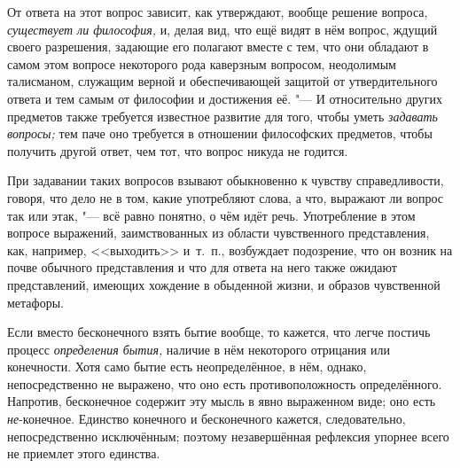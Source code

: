 От ответа на этот вопрос зависит, как утверждают, вообще решение вопроса,
{\em существует ли философия,} и, делая вид, что ещё
видят в нём вопрос, ждущий своего разрешения, задающие его полагают вместе
с тем, что они обладают в самом этом вопросе некоторого рода каверзным
вопросом, неодолимым талисманом, служащим верной и обеспечивающей защитой
от утвердительного ответа и тем самым от философии и достижения её. "--- И
относительно других предметов также требуется известное развитие для того,
чтобы уметь {\em задавать вопросы;} тем паче оно
требуется в отношении философских предметов, чтобы получить другой ответ,
чем тот, что вопрос никуда не годится.

При задавании таких вопросов взывают обыкновенно к чувству справедливости,
говоря, что дело не в том, какие употребляют слова, а что, выражают ли
вопрос так или этак, "--- всё равно понятно, о чём идёт речь. Употребление в
этом вопросе выражений, заимствованных из области чувственного
представления, как, например, <<выходить>> и~т.~п., возбуждает подозрение,
что он возник на почве обычного представления и что для ответа на него
также ожидают представлений, имеющих хождение в обыденной жизни, и образов
чувственной метафоры.

Если вместо бесконечного взять бытие вообще, то кажется, что легче постичь
процесс {\em определения бытия,} наличие в нём
некоторого отрицания или конечности. Хотя само бытие есть неопределённое, в
нём, однако, непосредственно не выражено, что оно есть противоположность
определённого. Напротив, бесконечное содержит эту мысль в явно выраженном
виде; оно есть {\em не}{}-конечное. Единство конечного
и бесконечного кажется, следовательно, непосредственно исключённым; поэтому
незавершённая рефлексия упорнее всего не приемлет этого единства.

